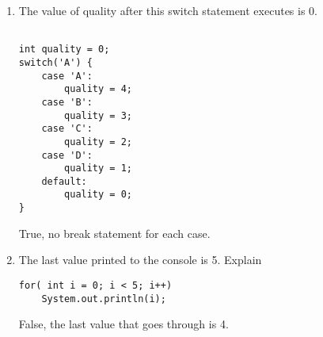 \begin{enumerate}
\begin{oneparchoices}
\end{oneparchoices}
\item {} \tf The value of quality after this switch statement executes is 0. 

\begin{lstlisting}

int quality = 0;
switch('A') {
	case 'A':
		quality = 4;
	case 'B':
		quality = 3;
	case 'C':
		quality = 2;
	case 'D':
		quality = 1;
	default:
		quality = 0;
}
\end{lstlisting}
\Ans True, no break statement for each case.

\item {} \tf The last value printed to the console is 5. Explain

\begin{lstlisting}
for( int i = 0; i < 5; i++)
	System.out.println(i);
\end{lstlisting}

\Ans False, the last value that goes through is 4. 

\clearpage


\clearpage
\ifdraft \clearpage \fi

\end{enumerate}   

              
